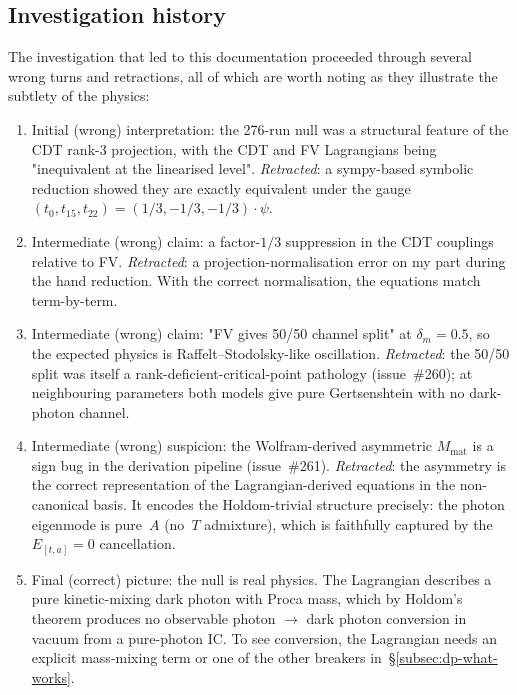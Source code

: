 \subsection{Investigation history}
\label{subsec:dp-history}

The investigation that led to this documentation proceeded through
several wrong turns and retractions, all of which are worth noting
as they illustrate the subtlety of the physics:

\begin{enumerate}
  \item Initial (wrong) interpretation: the 276-run null was a
        structural feature of the CDT rank-3 projection, with the
        CDT and FV Lagrangians being "inequivalent at the
        linearised level". \emph{Retracted}: a sympy-based
        symbolic reduction showed they are exactly equivalent
        under the gauge
        $(t_0, t_{15}, t_{22}) = (1/3, -1/3, -1/3)\cdot \psi$.
  \item Intermediate (wrong) claim: a factor-$1/3$ suppression in
        the CDT couplings relative to FV. \emph{Retracted}: a
        projection-normalisation error on my part during the hand
        reduction. With the correct normalisation, the equations
        match term-by-term.
  \item Intermediate (wrong) claim: "FV gives 50/50 channel split"
        at $\delta_m = 0.5$, so the expected physics is
        Raffelt--Stodolsky-like oscillation. \emph{Retracted}: the
        50/50 split was itself a rank-deficient-critical-point
        pathology (issue~\#260); at neighbouring parameters both
        models give pure Gertsenshtein with no dark-photon channel.
  \item Intermediate (wrong) suspicion: the Wolfram-derived
        asymmetric $M_{\mathrm{mat}}$ is a sign bug in the
        derivation pipeline (issue~\#261). \emph{Retracted}: the
        asymmetry is the correct representation of the
        Lagrangian-derived equations in the non-canonical basis.
        It encodes the Holdom-trivial structure precisely: the
        photon eigenmode is pure~$A$ (no~$T$ admixture), which is
        faithfully captured by the $E_{[t, a]} = 0$ cancellation.
  \item Final (correct) picture: the null is real physics. The
        Lagrangian describes a pure kinetic-mixing dark photon
        with Proca mass, which by Holdom's theorem produces no
        observable photon $\to$ dark photon conversion in vacuum
        from a pure-photon IC. To see conversion, the Lagrangian
        needs an explicit mass-mixing term or one of the other
        breakers in~\S\ref{subsec:dp-what-works}.
\end{enumerate}

